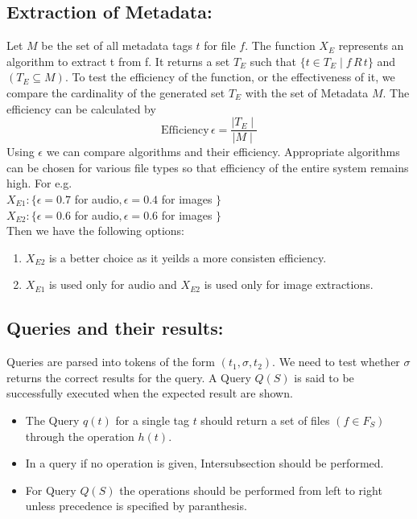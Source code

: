 \subsection{Extraction of Metadata:}
Let $M$ be the set of all metadata tags $t$ for file $f$. The function $X_{E}$ represents an algorithm to extract t from f. It returns a set $T_{E}$ such that $\{t \in T_{E} \mid f \, R \, t\}$ and $(T_E \subseteq M)$. To test the efficiency of the function, or the effectiveness of it, we compare the cardinality of the generated set $T_E$ with the set of Metadata $M$. The efficiency can be calculated by
$$\mathrm{Efficiency} \, \epsilon = \frac {\mid T_E \mid} {\mid M \mid}$$
Using $\epsilon$ we can compare algorithms and their efficiency. Appropriate algorithms can be chosen for various file types so that efficiency of the entire system remains high. For e.g. \\
\indent $X_{E1} : \{\epsilon =0.7$ for audio$, \epsilon = 0.4$ for images $\}$ \\
\indent $X_{E2} : \{\epsilon =0.6$ for audio$, \epsilon = 0.6$ for images $\}$ \\
Then we have the following options:
\begin{enumerate}
\item $X_{E2}$ is a better choice as it yeilds a more consisten efficiency.
\item $X_{E1}$ is used only for audio and $X_{E2}$ is used only for image extractions.
\end{enumerate}


\subsection{Queries and their results:}
Queries are parsed into tokens of the form $(t_1, \sigma , t_2)$. We need to test whether $\sigma $ returns the correct results for the query. A Query $Q(S)$ is said to be successfully executed when the expected result are shown.  
\begin{itemize}
\item The Query $q(t)$ for a single tag $t$ should return a set of files $(f \in F_{S})$ through the operation $h(t)$. 
\item In a query if no operation is given, Intersubsection should be performed. 
\item For Query $Q(S)$ the operations should be performed from left to right unless precedence is specified by paranthesis. 
\end{itemize}


